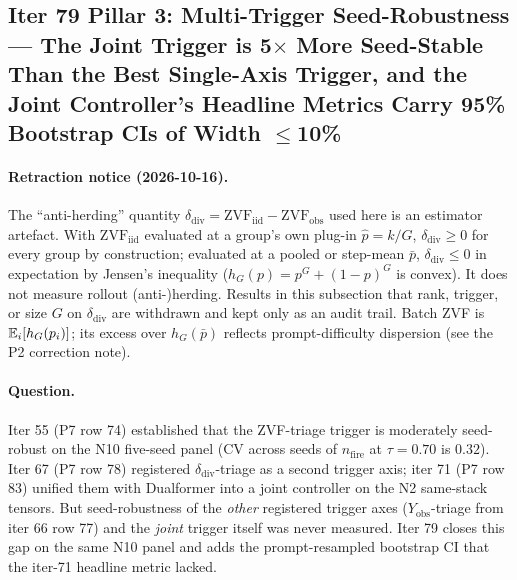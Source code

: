 \subsection{Iter 79 Pillar 3: Multi-Trigger Seed-Robustness ---
              The Joint Trigger is 5$\times$ More Seed-Stable Than
              the Best Single-Axis Trigger, and the Joint Controller's
              Headline Metrics Carry 95\% Bootstrap CIs of Width $\leq$10\%}
\label{sec:p7-iter79-multitrigger}

\paragraph{Retraction notice (2026-10-16).} The ``anti-herding'' quantity
$\delta_{\mathrm{div}}=\mathrm{ZVF}_{\mathrm{iid}}-\mathrm{ZVF}_{\mathrm{obs}}$
used here is an estimator artefact. With $\mathrm{ZVF}_{\mathrm{iid}}$
evaluated at a group's own plug-in $\hat p=k/G$, $\delta_{\mathrm{div}}\ge0$
for every group by construction; evaluated at a pooled or step-mean $\bar p$,
$\delta_{\mathrm{div}}\le0$ in expectation by Jensen's inequality ($h_G(p)=p^G+(1-p)^G$
is convex). It does not measure rollout (anti-)herding. Results in this
subsection that rank, trigger, or size $G$ on $\delta_{\mathrm{div}}$ are
withdrawn and kept only as an audit trail. Batch ZVF is $\mathbb{E}_i[h_G(p_i)]$; its
excess over $h_G(\bar p)$ reflects prompt-difficulty dispersion (see the P2
correction note).


\paragraph{Question.}
Iter 55 (P7 row 74) established that the ZVF-triage trigger is
moderately seed-robust on the N10 five-seed panel (CV across seeds of
$n_{\mathrm{fire}}$ at $\tau{=}0.70$ is $0.32$).  Iter 67 (P7 row 78)
registered $\delta_{\mathrm{div}}$-triage as a second trigger axis;
iter 71 (P7 row 83) unified them with Dualformer into a joint
controller on the N2 same-stack tensors.  But seed-robustness of the
\emph{other} registered trigger axes ($Y_{\mathrm{obs}}$-triage from
iter 66 row 77) and the \emph{joint} trigger itself was never
measured.  Iter 79 closes this gap on the same N10 panel and adds
the prompt-resampled bootstrap CI that the iter-71 headline metric
lacked.


